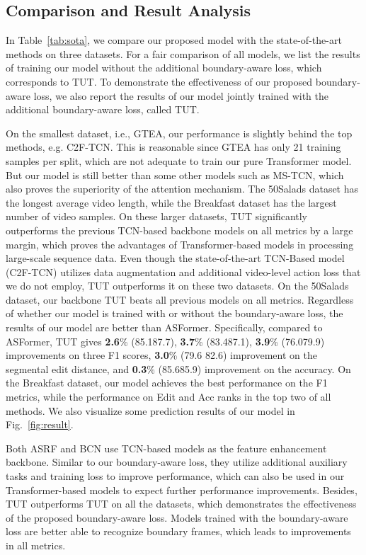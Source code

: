 \documentclass[letterpaper]{article} \usepackage[submission]{aaai23}  \usepackage{times}  \usepackage{helvet}  \usepackage{courier}  \usepackage[hyphens]{url}  \usepackage{graphicx} \urlstyle{rm} \def\UrlFont{\rm}  \usepackage{natbib}  \usepackage{caption} \frenchspacing  \setlength{\pdfpagewidth}{8.5in} \setlength{\pdfpageheight}{11in} \usepackage{algorithm}
\begin{document}
\subsection{Comparison and Result Analysis}

In Table~\ref{tab:sota}, we compare our proposed model with the state-of-the-art methods on three datasets. For a fair comparison of all models, we list the results of training our model without the additional boundary-aware loss, which corresponds to TUT. To demonstrate the effectiveness of our proposed boundary-aware loss, we also report the results of our model jointly trained with the additional boundary-aware loss, called TUT.

On the smallest dataset, i.e., GTEA, our performance is slightly behind the top methods, e.g. C2F-TCN. This is reasonable since GTEA has only 21 training samples per split, which are not adequate to train our pure Transformer model. But our model is still better than some other models such as MS-TCN, which also proves the superiority of the attention mechanism. The 50Salads dataset has the longest average video length, while the Breakfast dataset has the largest number of video samples. On these larger datasets, TUT significantly outperforms the previous TCN-based backbone models on all metrics by a large margin, which proves the advantages of Transformer-based models in processing large-scale sequence data. Even though the state-of-the-art TCN-Based model (C2F-TCN) utilizes data augmentation and additional video-level action loss that we do not employ, TUT outperforms it on these two datasets. On the 50Salads dataset, our backbone TUT beats all previous models on all metrics. Regardless of whether our model is trained with or without the boundary-aware loss, the results of our model are better than ASFormer. Specifically, compared to ASFormer, TUT gives \textbf{2.6}\% (85.187.7), \textbf{3.7}\% (83.487.1), \textbf{3.9}\% (76.079.9) improvements on three F1 scores, \textbf{3.0}\% (79.6 82.6) improvement on the segmental edit distance, and \textbf{0.3}\% (85.685.9) improvement on the accuracy. On the Breakfast dataset, our model achieves the best performance on the F1 metrics, while the performance on Edit and Acc ranks in the top two of all methods. We also visualize some prediction results of our model in Fig.~\ref{fig:result}. 

Both ASRF and BCN use TCN-based models as the feature enhancement backbone. Similar to our boundary-aware loss, they utilize additional auxiliary tasks and training loss to improve performance, which can also be used in our Transformer-based models to expect further performance improvements. Besides, TUT outperforms TUT on all the datasets, which demonstrates the effectiveness of the proposed boundary-aware loss. Models trained with the boundary-aware loss are better able to recognize boundary frames, which leads to improvements in all metrics.
\end{document}
